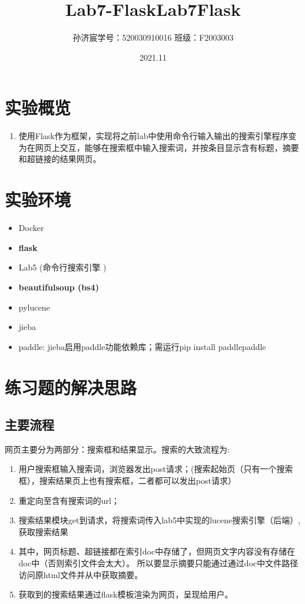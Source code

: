 \documentclass[12pt,a4paper]{article}
\title{Lab7-Flask}
\title{Lab7\quad Flask}
\date{2021.11}
\author{孙济宸\quad \quad 学号：520030910016 \quad  \quad 班级：F2003003}
\begin{document}
\maketitle
\section{实验概览}
\begin{enumerate}
\item 使用Flask作为框架，实现将之前lab中使用命令行输入输出的搜索引擎程序变为在网页上交互，能够在搜索框中输入搜索词，并按条目显示含有标题，摘要和超链接的结果网页。
\end{enumerate}
\section{实验环境}
\begin{itemize}
	\item Docker
	\item \textbf{flask}
	\item Lab5 (命令行搜索引擎 )
	\item \textbf{beautifulsoup (bs4)}
	\item {pylucene}
	\item {jieba}
	\item {paddle}: jieba启用paddle功能依赖库；需运行pip install paddlepaddle

\end{itemize}
\newpage

\section{练习题的解决思路}
\subsection{主要流程}
网页主要分为两部分：搜索框和结果显示。搜索的大致流程为:
\begin{enumerate}
\item 用户搜索框输入搜索词，浏览器发出post请求；(搜索起始页（只有一个搜索框），搜索结果页上也有搜索框，二者都可以发出post请求）
\item 重定向至含有搜索词的url；
\item 搜索结果模块get到请求，将搜索词传入lab5中实现的lucene搜索引擎（后端）,获取搜索结果
\item 其中，网页标题、超链接都在索引doc中存储了，但网页文字内容没有存储在doc中（否则索引文件会太大）。
所以要显示摘要只能通过通过doc中文件路径访问原html文件并从中获取摘要。
\item 获取到的搜索结果通过flask模板渲染为网页，呈现给用户。
\end{enumerate}
\end{document}
